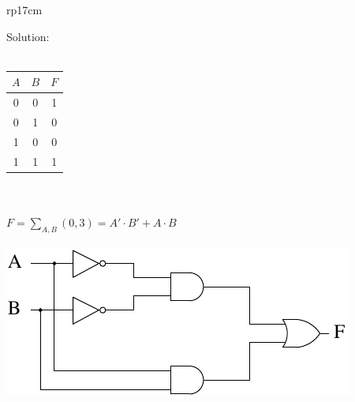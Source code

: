 \documentclass{article}
\begin{document}
\begin{longtable}[l]{rp{17cm}}
\begin{minipage}[t]{\linewidth}
Solution: \\ \\
\begin{tabular}{cc|c}
  $A$ & $B$ & $F$ \\
  \hline
   0  &  0  &  1 \\
   0  &  1  &  0 \\
   1  &  0  &  0 \\
   1  &  1  &  1 \\
\end{tabular}\\ \\
$F=\sum_{A,B}(0,3)=A' \cdot B' + A \cdot B$\\ \\
\includegraphics{../CombinationalCircuits/Assessments/wakerly_4_36}\\
\end{minipage}\\
\medskip
\end{longtable}
\end{document}
